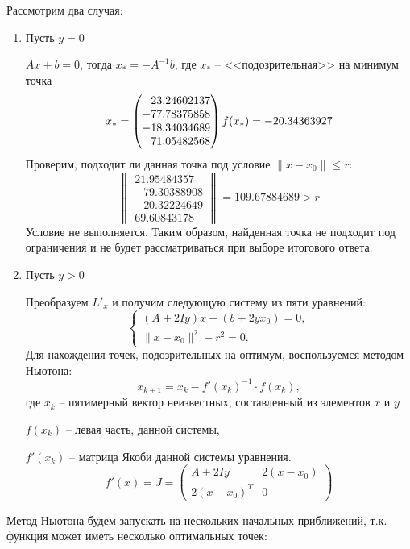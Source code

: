 \documentclass[a4paper, 14pt]{extarticle}
\begin{document}
 		Рассмотрим два случая:
 		\begin{enumerate}
 			\item Пусть $y = 0$
 			
 			$Ax + b = 0$, тогда $x_* = -A^{-1}b$, где $x_*$ -- <<подозрительная>> на минимум точка
 			\[ 
	 			x_* = 
	 			\begin{pmatrix}
	 				\hphantom{-}23.24602137\\
	 				-77.78375858\\
	 				-18.34034689\\
	 				\hphantom{-}71.05482568
	 			\end{pmatrix}
 				f(x_*) = -20.34363927
 			\]
 			Проверим, подходит ли данная точка под условие $\|x - x_0\| \leq r$:
 			\[ 
 				\begin{Vmatrix}
 					21.95484357\\
 					-79.30388908\\
 					-20.32224649\\
 					 69.60843178
				\end{Vmatrix}
				=
				109.67884689 > r
			\]
			Условие не выполняется. Таким образом, найденная точка не подходит под ограничения и не будет рассматриваться при выборе итогового ответа.
			
			\item Пусть $y > 0$
			
			Преобразуем $L'_x$ и получим следующую систему из пяти уравнений:
			\[ 
				\begin{cases}
					(A + 2Iy)x + (b + 2yx_0) = 0,\\
					\|x - x_0\|^2 - r^2 = 0.
				\end{cases}			
			 \]
			 Для нахождения точек, подозрительных на оптимум, воспользуемся методом	Ньютона:
			 \[ x_{k+1} = x_k - f'(x_k)^{-1} \cdot f(x_k), \]
			 где $x_k$ -- пятимерный вектор неизвестных, составленный из элементов $x$ и $y$
			 
			 $f(x_k)$ -- левая часть, данной системы,
			 
			 $f'(x_k)$ -- матрица Якоби данной системы уравнения.
			 \[ 
				 f'(x) = J = 
				 \begin{pmatrix}
				 	A + 2Iy & 2(x-x_0)\\
				 	2(x-x_0)^T & 0
				 \end{pmatrix} 
		 	\]
 		\end{enumerate}
	 	Метод Ньютона будем запускать на нескольких начальных приближений, т.к. функция может иметь несколько оптимальных точек:
\end{document}
